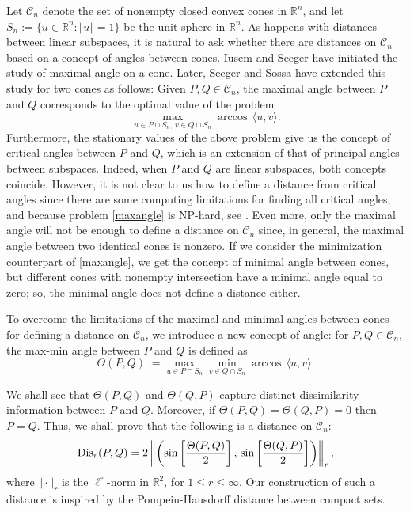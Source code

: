 \documentclass[hidelinks,onefignum,onetabnum]{siamart250211}
\theoremstyle{definition}
\theoremstyle{remark}
\newcommand{\CC}{\mathcal C}
\newcommand{\RR}{\mathbb R}
\newcommand{\Sim}{{\rm Dis}}
\newcommand{\inner}[2]{\langle#1,#2\rangle}
\begin{document}
Let $\CC_n$ denote the set of nonempty closed convex cones in $\RR^n$, and let $S_n:=\{u\in\mathbb R^n:\Vert u\Vert =1\}$ be the unit sphere in $\RR^n$. As happens with distances between linear subspaces, it is natural to ask whether there are distances on $\CC_n$ based on a concept of angles between cones. Iusem and Seeger \cite{IS1,IS2,IS3,IS4} have initiated the study of maximal angle on a cone. Later, Seeger and Sossa \cite{SeSo1,SeSo2} have extended this study for two cones as follows: Given $P,Q\in\CC_n$, the maximal angle between $P$ and $Q$ corresponds to the optimal value of the problem
\begin{equation}\label{maxangle}
\max_{u\in P\cap S_n,\,v\in Q\cap S_n}\arccos\,\langle u,v\rangle.
\end{equation}
Furthermore, the stationary values of the above problem give us the concept of critical angles between $P$ and $Q$, which is an extension of that of principal angles between subspaces. Indeed, when $P$ and $Q$ are linear subspaces, both concepts coincide. However, it is not clear to us how to define a distance from critical angles since there are some computing limitations for finding all critical angles, and because problem \eqref{maxangle} is NP-hard, see \cite{dOSS,BGS}. Even more, only the maximal angle will not be enough  to define a distance on $\CC_n$ since, in general, the maximal angle between two identical cones is nonzero. If we consider the minimization counterpart of \eqref{maxangle}, we get the concept of minimal angle between cones, but different cones with nonempty intersection have a minimal angle equal to zero; so, the minimal angle does not define a distance either.


To overcome the limitations of the maximal and minimal angles between cones for defining a distance on $\CC_n$, we introduce a new concept of angle: for $P,Q\in\CC_n$, the max-min angle between $P$ and $Q$ is defined as 
\begin{equation}\label{maxminPQ}
\Theta(P,Q):=\max_{u\in P\cap S_n}\min_{v\in Q\cap S_n}\arccos\,\inner{u}{v}.
\end{equation}

We shall see that $\Theta(P,Q)$ and $\Theta(Q,P)$ capture distinct dissimilarity information between $P$ and $Q$. Moreover, if $\Theta(P,Q)=\Theta(Q,P)=0$ then $P=Q$. Thus,  we shall prove that the following is a distance on $\CC_n$:
\[
\Sim_r(P,Q)=2\left\Vert\left(\sin\left[\frac{\Theta(P,Q)}{2}\right],\,\sin\left[\frac{\Theta(Q,P)}{2}\right]\right)\right\Vert_r,
\]
where $\Vert\cdot\Vert_r$ is the $\ell^r$-norm in $\RR^2$, for $1\leq r\leq\infty$. Our construction of such a distance is inspired by the Pompeiu-Hausdorff distance between compact sets.
\end{document}
